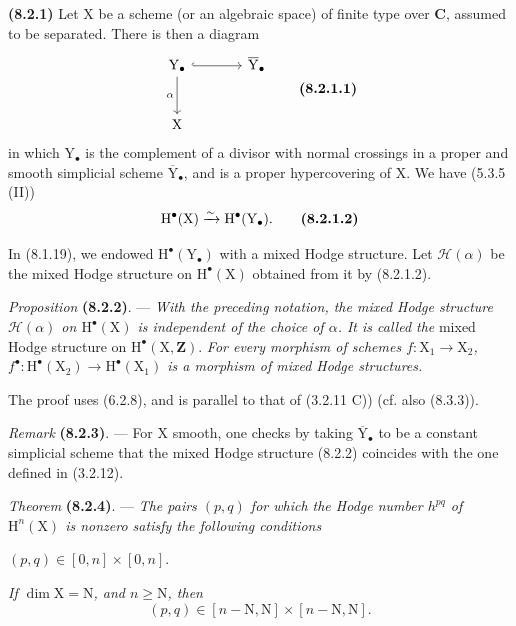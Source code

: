 \documentclass[11pt,leqno]{article}
\begin{document}
\textbf{(8.2.1)} Let \(\mathrm{X}\) be a scheme (or an algebraic space) of finite type over \(\mathbf{C}\), assumed to be separated. There is then a diagram
\[
\begin{tikzcd}[column sep=large,row sep=large]
\mathrm{Y}_\bullet \arrow[r,hook] \arrow[d,"\alpha"']
  & \overline{\mathrm{Y}}_\bullet\\
\mathrm{X} &
\end{tikzcd}
\tag*{\textbf{(8.2.1.1)}}
\]
in which \(\mathrm{Y}_\bullet\) is the complement of a divisor with normal crossings in a proper and smooth simplicial scheme \(\overline{\mathrm{Y}}_\bullet\), and is a proper hypercovering of \(\mathrm{X}\). We have (5.3.5 (II))
\[
\mathrm{H}^\bullet(\mathrm{X})
\xrightarrow{\sim}\mathrm{H}^\bullet(\mathrm{Y}_\bullet).
\tag*{\textbf{(8.2.1.2)}}
\]

In (8.1.19), we endowed \(\mathrm{H}^\bullet(\mathrm{Y}_\bullet)\) with a mixed Hodge structure. Let \(\mathcal{H}(\alpha)\) be the mixed Hodge structure on \(\mathrm{H}^\bullet(\mathrm{X})\) obtained from it by (8.2.1.2).

\textit{Proposition} \textbf{(8.2.2)}. — \textit{With the preceding notation, the mixed Hodge structure \(\mathcal{H}(\alpha)\) on \(\mathrm{H}^\bullet(\mathrm{X})\) is independent of the choice of \(\alpha\). It is called the} mixed Hodge structure on \(\mathrm{H}^\bullet(\mathrm{X},\mathbf{Z})\). \textit{For every morphism of schemes \(f:\mathrm{X}_1\to\mathrm{X}_2\), \(f^\bullet:\mathrm{H}^\bullet(\mathrm{X}_2)\to\mathrm{H}^\bullet(\mathrm{X}_1)\) is a morphism of mixed Hodge structures.}

The proof uses (6.2.8), and is parallel to that of (3.2.11 C)) (cf. also (8.3.3)).

\textit{Remark} \textbf{(8.2.3)}. — For \(\mathrm{X}\) smooth, one checks by taking \(\overline{\mathrm{Y}}_\bullet\) to be a constant simplicial scheme that the mixed Hodge structure (8.2.2) coincides with the one defined in (3.2.12).

\textit{Theorem} \textbf{(8.2.4)}. — \textit{The pairs \((p,q)\) for which the Hodge number \(h^{pq}\) of \(\mathrm{H}^n(\mathrm{X})\) is nonzero satisfy the following conditions}

\noindent\hspace*{\parindent}
\((p,q)\in[0,n]\times[0,n]\).

\noindent\hspace*{\parindent}
\textit{If \(\dim\mathrm{X}=\mathrm{N}\), and \(n\geq\mathrm{N}\), then}
\[
(p,q)\in[n-\mathrm{N},\mathrm{N}]\times[n-\mathrm{N},\mathrm{N}].
\]
\end{document}
